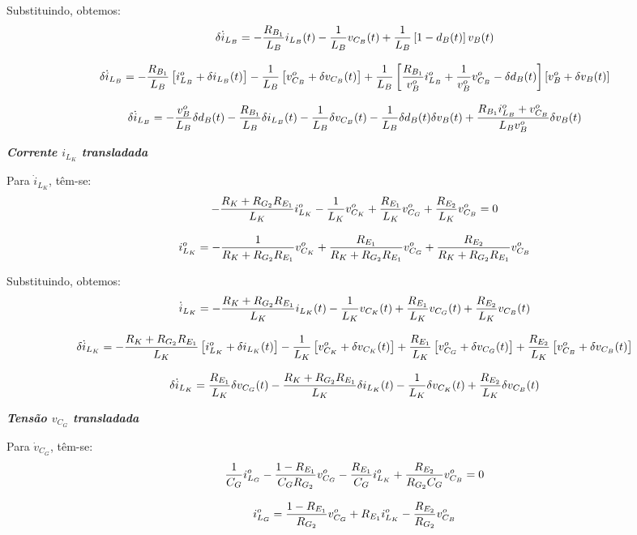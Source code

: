 \documentclass{article}
\newcommand{\nle}{%
  \notag \\[8pt]
}
\begin{document}
Substituindo, obtemos:
\begin{gather}
  \delta \dot{i}_{L_B} = - \frac{R_{B_1}}{L_B} i_{L_B}(t) - \frac{1}{L_B} v_{C_B} (t) + \frac{1}{L_B} \left[1 - d_B(t)\right] v_B(t) \nle
  \delta \dot{i}_{L_B} = - \frac{R_{B_1}}{L_B} \left[i_{L_B}^o + \delta i_{L_B}(t)\right]
  - \frac{1}{L_B} \left[v_{C_B}^o + \delta v_{C_B} (t)\right]
  + \frac{1}{L_B} \left[\frac{R_{B_1}}{v_B^o} i_{L_B}^o + \frac{1}{v_B^o} v_{C_B}^o - \delta d_B(t)\right]
  \left[v_B^o + \delta v_B(t)\right] \nle
  \delta \dot{i}_{L_B} = - \frac{v_B^o}{L_B} \delta d_B(t) - \frac{R_{B_1}}{L_B} \delta i_{L_B}(t)
  - \frac{1}{L_B} \delta v_{C_B}(t) - \frac{1}{L_B} \delta d_B(t) \delta v_B(t)
  + \frac{R_{B_1} i_{L_B}^o + v_{C_B}^o}{L_B v_B^o} \delta v_B(t)
\end{gather}

\textbf{\textit{Corrente $i_{L_K}$ transladada}} \vspace*{12pt}

Para $\dot{i}_{L_K}$, têm-se:
\begin{gather}
  - \frac{R_K + R_{G_2} R_{E_1}}{L_K} i_{L_K}^o - \frac{1}{L_K} v_{C_K}^o  + \frac{R_{E_1}}{L_K} v_{C_G}^o + \frac{R_{E_2}}{L_K} v_{C_B}^o = 0 \nle
  i_{L_K}^o = - \frac{1}{R_K + R_{G_2} R_{E_1}} v_{C_K}^o  + \frac{R_{E_1}}{R_K + R_{G_2} R_{E_1}} v_{C_G}^o + \frac{R_{E_2}}{R_K + R_{G_2} R_{E_1}} v_{C_B}^o
\end{gather}

Substituindo, obtemos:
\begin{gather}
  \dot{i}_{L_K} = - \frac{R_K + R_{G_2} R_{E_1}}{L_K} i_{L_K}(t) - \frac{1}{L_K} v_{C_K}(t)  + \frac{R_{E_1}}{L_K} v_{C_G}(t) + \frac{R_{E_2}}{L_K} v_{C_B}(t) \nle
  \delta \dot{i}_{L_K} = - \frac{R_K + R_{G_2} R_{E_1}}{L_K} \left[i_{L_K}^o + \delta i_{L_K}(t) \right] - \frac{1}{L_K} \left[v_{C_K}^o + \delta v_{C_K}(t)\right]  + \frac{R_{E_1}}{L_K} \left[v_{C_G}^o + \delta v_{C_G}(t)\right] + \frac{R_{E_2}}{L_K} \left[v_{C_B}^o + \delta v_{C_B}(t)\right] \nle
  \delta \dot{i}_{L_K} = \frac{R_{E_1}}{L_K} \delta v_{C_G}(t) - \frac{R_K+R_{G_2}R_{E_1}}{L_K} \delta i_{L_K}(t)
  - \frac{1}{L_K} \delta v_{C_K}(t) + \frac{R_{E_2}}{L_K} \delta v_{C_B}(t)
\end{gather}

\textbf{\textit{Tensão $v_{C_G}$ transladada}} \vspace*{12pt}

Para $\dot{v}_{C_G}$, têm-se:
\begin{gather}
  \frac{1}{C_G} i_{L_G}^o - \frac{1 - R_{E_1}}{C_G R_{G_2}} v_{C_G}^o - \frac{R_{E_1}}{C_G} i_{L_K}^o + \frac{R_{E_2}}{R_{G_2} C_G} v_{C_B}^o = 0 \nle
  i_{L_G}^o = \frac{1 - R_{E_1}}{R_{G_2}} v_{C_G}^o + R_{E_1} i_{L_K}^o - \frac{R_{E_2}}{R_{G_2}} v_{C_B}^o
\end{gather}
\end{document}
